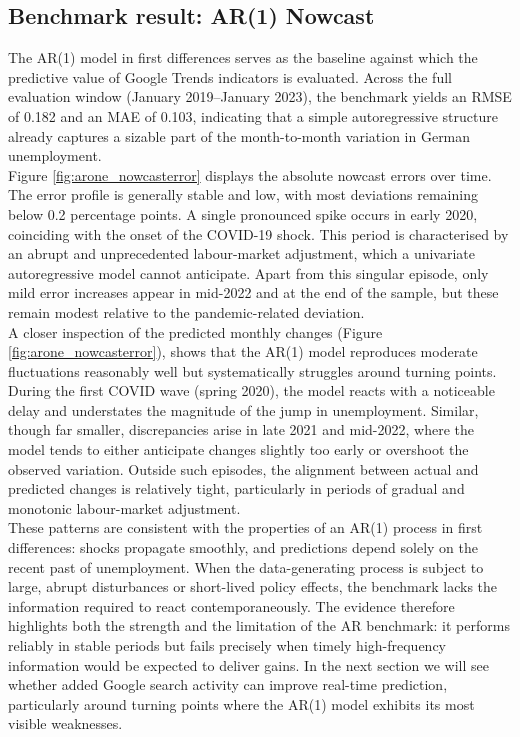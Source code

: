 \documentclass[12pt,a4paper]{article}
\begin{document}
\subsection{Benchmark result: AR(1) Nowcast}
The AR(1) model in first differences serves as the baseline against which the predictive value of Google Trends indicators is evaluated. Across the full evaluation window (January 2019–January 2023), the benchmark yields an RMSE of 0.182 and an MAE of 0.103, indicating that a simple autoregressive structure already captures a sizable part of the month-to-month variation in German unemployment.\\
Figure \ref{fig:arone_nowcasterror} displays the absolute nowcast errors over time. The error profile is generally stable and low, with most deviations remaining below 0.2 percentage points. A single pronounced spike occurs in early 2020, coinciding with the onset of the COVID-19 shock.
This period is characterised by an abrupt and unprecedented labour-market adjustment, which a univariate autoregressive model cannot anticipate. Apart from this singular episode, only mild error increases appear in mid-2022 and at the end of the sample, but these remain modest relative to the pandemic-related deviation.\\
A closer inspection of the predicted monthly changes (Figure \ref{fig:arone_nowcasterror}), shows that the AR(1) model reproduces moderate fluctuations reasonably well but systematically struggles around turning points.
During the first COVID wave (spring 2020), the model reacts with a noticeable delay and understates the magnitude of the jump in unemployment. Similar, though far smaller, discrepancies arise in late 2021 and mid-2022, where the model tends to either anticipate changes slightly too early or overshoot the observed variation.
Outside such episodes, the alignment between actual and predicted changes is relatively tight, particularly in periods of gradual and monotonic labour-market adjustment.\\
These patterns are consistent with the properties of an AR(1) process in first differences: shocks propagate smoothly, and predictions depend solely on the recent past of unemployment. When the data-generating process is subject to large, abrupt disturbances or short-lived policy effects, the benchmark lacks the information required to react contemporaneously. The evidence therefore highlights both the strength and the limitation of the AR benchmark: it performs reliably in stable periods but fails precisely when timely high-frequency information would be expected to deliver gains.
In the next section we will see whether added Google search activity can improve real-time prediction, particularly around turning points where the AR(1) model exhibits its most visible weaknesses.
\end{document}
